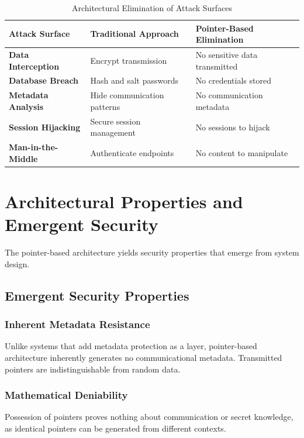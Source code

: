 \documentclass[11pt,a4paper]{article}
\begin{document}
\begin{table}[h]
\centering
\caption{Architectural Elimination of Attack Surfaces}
\begin{tabularx}{\textwidth}{|l|X|X|}
\hline
\textbf{Attack Surface} & \textbf{Traditional Approach} & \textbf{Pointer-Based Elimination} \\
\hline
\textbf{Data Interception} & Encrypt transmission & No sensitive data transmitted \\
\hline
\textbf{Database Breach} & Hash and salt passwords & No credentials stored \\
\hline
\textbf{Metadata Analysis} & Hide communication patterns & No communication metadata \\
\hline
\textbf{Session Hijacking} & Secure session management & No sessions to hijack \\
\hline
\textbf{Man-in-the-Middle} & Authenticate endpoints & No content to manipulate \\
\hline
\end{tabularx}
\end{table}

\section{Architectural Properties and Emergent Security}

The pointer-based architecture yields security properties that emerge from system design.

\subsection{Emergent Security Properties}

\subsubsection{Inherent Metadata Resistance}
Unlike systems that add metadata protection as a layer, pointer-based architecture inherently generates no communicational metadata. Transmitted pointers are indistinguishable from random data.

\subsubsection{Mathematical Deniability}
Possession of pointers proves nothing about communication or secret knowledge, as identical pointers can be generated from different contexts.
\end{document}

